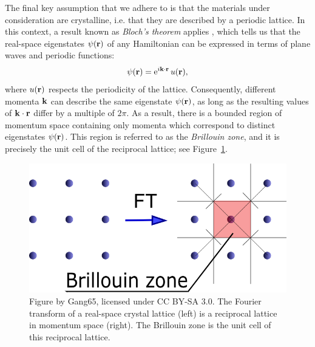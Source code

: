 The final key assumption that we adhere to is that the materials under consideration are crystalline, i.e. that they are described by a periodic lattice. In this context, a result known as \emph{Bloch's theorem} applies \cite{Bloch_theorem}, which tells us that the real-space eigenstates $\psi(\vb{r})$ of any Hamiltonian can be expressed in terms of plane waves and periodic functions:
\begin{equation*}
	\psi(\vb{r}) = \operatorname{e}^{i\vb{k}\cdot\vb{r}} u(\vb{r}),
\end{equation*}
where $u(\vb{r})$ respects the periodicity of the lattice. Consequently, different momenta $\vb{k}$ can describe the same eigenstate $\psi(\vb{r})$, as long as the resulting values of $\vb{k}\cdot\vb{r}$ differ by a multiple of $2\pi$. As a result, there is a bounded region of momentum space containing only momenta which correspond to distinct eigenstates $\psi(\vb{r})$. This region is referred to as the \emph{Brillouin zone}, and it is precisely the unit cell of the reciprocal lattice; see Figure~\ref{fig:Brillouin_zone}.
\begin{figure}[htb!]
	\centering
	\includegraphics[width=.7\linewidth]{Images/Brillouin_zone}
	\caption{Figure by Gang65, licensed under CC BY-SA 3.0. The Fourier transform of a real-space crystal lattice (left) is a reciprocal lattice in momentum space (right). The Brillouin zone is the unit cell of this reciprocal lattice.}
	\label{fig:Brillouin_zone}
\end{figure}

